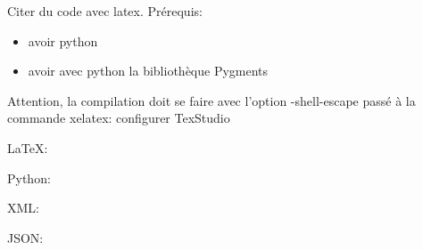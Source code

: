 \documentclass[12pt]{book}
\begin{document}
	Citer du code avec latex. Prérequis:
	\begin{itemize}
		\item avoir python 
		\item avoir avec python la bibliothèque Pygments %
	\end{itemize}
	
	Attention, la compilation doit se faire avec l'option -shell-escape passé à la commande xelatex:  configurer  TexStudio
	 
	
	
	\LaTeX: 
	
	
	Python:
	
	
	XML:
	
	
	JSON:
	
	
	
\end{document}
